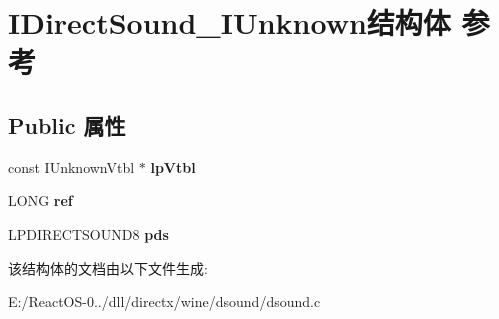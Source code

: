 \hypertarget{struct_i_direct_sound___i_unknown}{}\section{I\+Direct\+Sound\+\_\+\+I\+Unknown结构体 参考}
\label{struct_i_direct_sound___i_unknown}
\subsection*{Public 属性}
\begin{DoxyCompactItemize}
\item 
\mbox{\label{struct_i_direct_sound___i_unknown_a6b45258eceb768c258ebfbf8d7873940}} 
const I\+Unknown\+Vtbl $\ast$ {\bfseries lp\+Vtbl}
\item 
\mbox{\label{struct_i_direct_sound___i_unknown_ae2b9a05593b1a5c2f4dd9e562872d21b}} 
L\+O\+NG {\bfseries ref}
\item 
\mbox{\label{struct_i_direct_sound___i_unknown_a80554a61aa12c208d0851bd54a8c8799}} 
L\+P\+D\+I\+R\+E\+C\+T\+S\+O\+U\+N\+D8 {\bfseries pds}
\end{DoxyCompactItemize}


该结构体的文档由以下文件生成\+:\begin{DoxyCompactItemize}
\item 
E\+:/\+React\+O\+S-\/0../dll/directx/wine/dsound/dsound.\+c\end{DoxyCompactItemize}
